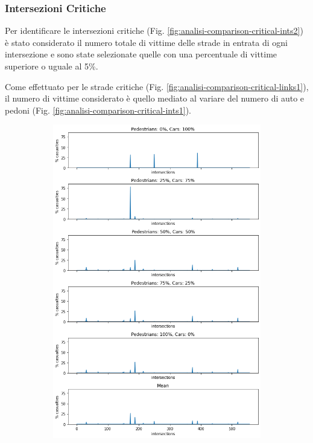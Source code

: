 \subsubsection*{Intersezioni Critiche}
Per identificare le intersezioni critiche (Fig. \ref{fig:analisi-comparison-critical-ints2}) è stato considerato il numero totale di vittime delle strade 
in entrata di ogni intersezione e sono state selezionate quelle con una percentuale di vittime superiore o uguale al 5\%.

Come effettuato per le strade critiche (Fig. \ref{fig:analisi-comparison-critical-links1}), il numero di vittime considerato è quello mediato al variare del numero di auto e pedoni (Fig. \ref{fig:analisi-comparison-critical-ints1}).

\begin{figure}[ht]
    \centering
    \begin{subfigure}{0.45\textwidth}
        \centering
        \includegraphics[width=\textwidth]{images/analisi/comparison-critical-ints-base.png}

\end{subfigure}
\end{figure}
